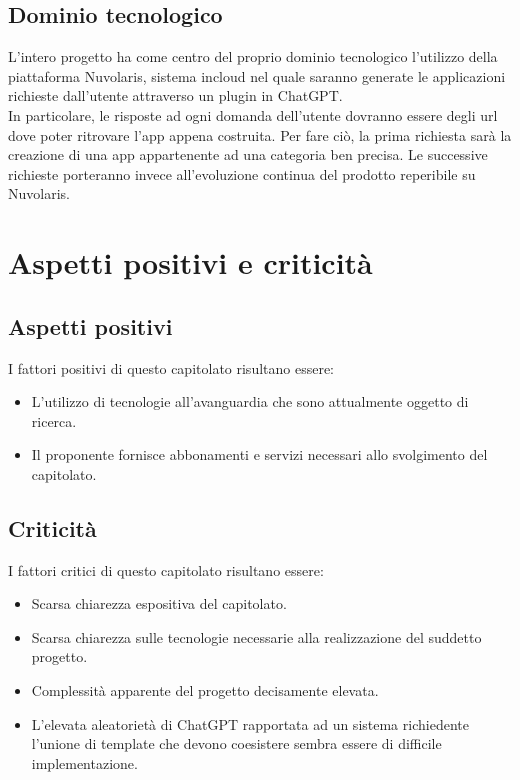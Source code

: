 \documentclass[12pt]{report}
\begin{document}
\subsection{Dominio tecnologico}
L'intero progetto ha come centro del proprio dominio tecnologico l'utilizzo della piattaforma Nuvolaris, sistema incloud nel quale saranno generate le applicazioni richieste dall'utente attraverso un plugin in ChatGPT.\\
In particolare, le risposte ad ogni domanda dell'utente dovranno essere degli url dove poter ritrovare l'app appena costruita. Per fare ciò, la prima richiesta sarà la creazione di una app appartenente ad una categoria ben precisa. Le successive richieste porteranno invece all'evoluzione continua del prodotto reperibile su Nuvolaris.

\section{Aspetti positivi e criticità}
\subsection{Aspetti positivi}
I fattori positivi di questo capitolato risultano essere:
\begin{itemize}
  \item L’utilizzo di tecnologie all’avanguardia che sono attualmente oggetto di ricerca.
  \item Il proponente fornisce abbonamenti e servizi necessari allo svolgimento del capitolato.
\end{itemize}

\subsection{Criticità}
I fattori critici di questo capitolato risultano essere:
\begin{itemize}
    \item Scarsa chiarezza espositiva del capitolato.
    \item Scarsa chiarezza sulle tecnologie necessarie alla realizzazione del suddetto progetto.
    \item Complessità apparente del progetto decisamente elevata.
    \item L'elevata aleatorietà di ChatGPT rapportata ad un sistema richiedente l'unione di template che devono coesistere sembra essere di difficile implementazione.
\end{itemize}
\end{document}
